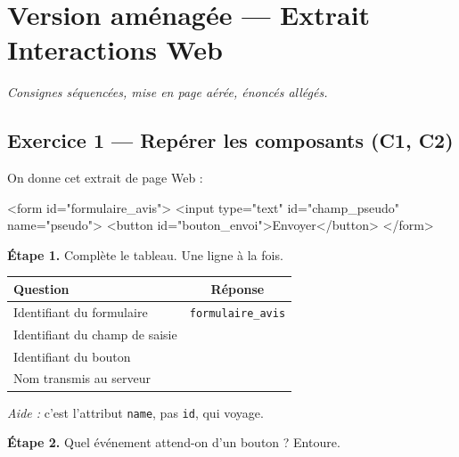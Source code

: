 \section*{Version aménagée --- Extrait Interactions Web}
\textit{Consignes séquencées, mise en page aérée, énoncés allégés.}

\bigskip

\subsection*{Exercice 1 --- Repérer les composants (C1, C2)}

On donne cet extrait de page Web :

\begin{console}
<form id="formulaire_avis">
  <input type="text" id="champ_pseudo" name="pseudo">
  <button id="bouton_envoi">Envoyer</button>
</form>
\end{console}

\bigskip

\textbf{Étape 1.} Complète le tableau. Une ligne à la fois.

\bigskip

\begin{center}
\begin{tabular}{|l|c|}
\hline
\textbf{Question} & \textbf{Réponse} \\
\hline
Identifiant du formulaire & \texttt{formulaire\_avis} \\
\hline
Identifiant du champ de saisie & \dotfill \\
\hline
Identifiant du bouton & \dotfill \\
\hline
Nom transmis au serveur & \dotfill \\
\hline
\end{tabular}
\end{center}

\medskip
\textit{Aide :} c'est l'attribut \texttt{name}, pas \texttt{id}, qui voyage.

\bigskip

\textbf{Étape 2.} Quel événement attend-on d'un bouton ? Entoure.

